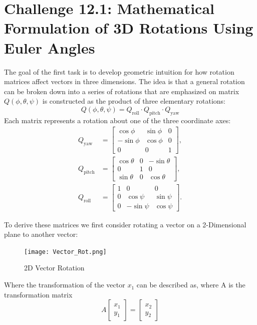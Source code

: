 \documentclass[12pt]{article}
\begin{document}
\section*{Challenge 12.1: Mathematical Formulation of 3D Rotations Using Euler Angles}
The goal of the first task is to develop geometric intuition for how rotation matrices affect vectors in three dimensions. The idea is that a general rotation can be broken down into a series of rotations that are emphasized on matrix $Q(\phi, \theta, \psi)$ is constructed as the product of three elementary rotations:
\[ Q(\phi, \theta, \psi) = Q_{\text{roll}} \cdot Q_{\text{pitch}} \cdot Q_{\text{yaw}} \]
Each matrix represents a rotation about one of the three coordinate axes:
\begin{align*}
Q_{\text{yaw}} &= \begin{bmatrix} \cos\phi & \sin\phi & 0 \\ -\sin\phi & \cos\phi & 0 \\ 0 & 0 & 1 \end{bmatrix}, \\
Q_{\text{pitch}} &= \begin{bmatrix} \cos\theta & 0 & -\sin\theta \\ 0 & 1 & 0 \\ \sin\theta & 0 & \cos\theta \end{bmatrix}, \\
Q_{\text{roll}} &= \begin{bmatrix} 1 & 0 & 0 \\ 0 & \cos\psi & \sin\psi \\ 0 & -\sin\psi & \cos\psi \end{bmatrix}.
\end{align*}

To derive these matrices we first consider rotating a vector on a 2-Dimensional plane to another vector:
\begin{figure}[h]
    \centering
    \texttt{[image: Vector\_Rot.png]}
    \caption{2D Vector Rotation}
    \label{fig:enter-label}
\end{figure}

Where the transformation of the vector $x_1$ can be described as, where A is the transformation matrix
\[A\begin{bmatrix}
    x_1 \\ y_1
\end{bmatrix} = \begin{bmatrix}
    x_2 \\ y_2
\end{bmatrix}\]
\end{document}
